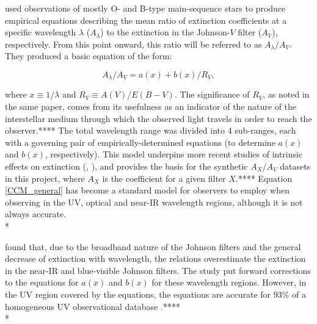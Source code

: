 \documentclass[12pt, a4paper]{report}
\begin{document}
\cite{1989ApJ...345..245C} used observations of mostly O- and B-type main-sequence stars to produce empirical equations describing the mean ratio of extinction coefficients at a specific wavelength $\lambda$ ($A_{\lambda}$) to the extinction in the Johnson-$V$ filter ($A_{V}$), respectively. From this point onward, this ratio will be referred to as $A_{\lambda}/A_{V}$. They produced a basic equation of the form:


\begin{equation}
A_{\lambda}/A_{V} = a(x) + b(x)/R_{V},
\label{CCM_general}
\end{equation}

where $x \equiv 1/\lambda$ and $R_{V} \equiv A(V)/E(B-V)$. The significance of $R_{V}$, as noted in the same paper, comes from its usefulness as an indicator of the nature of the interstellar medium through which the observed light travels in order to reach the observer.**** The total wavelength range was divided into 4 sub-ranges, each with a governing pair of empirically-determined equations (to determine $a(x)$ and $b(x)$, respectively). This model underpins more recent studies of intrinsic effects on extinction (\cite{2008PASP..120..583G}, \cite{2018MNRAS.479L.102C}), and provides the basis for the synthetic $A_{X}/A_{V}$ datasets in this project, where $A_{X}$ is the coefficient for a given filter $X$.**** Equation \ref{CCM_general} has become a standard model for observers to employ when observing in the UV, optical and near-IR wavelength regions, although it is not always accurate. \\*

\cite{1999PASP..111...63F} found that, due to the broadband nature of the Johnson filters and the general decrease of extinction with wavelength, the \cite{1989ApJ...345..245C} relations overestimate the extinction in the near-IR and blue-visible Johnson filters. The study put forward corrections to the equations for $a(x)$ and $b(x)$ for these wavelength regions. However, in the UV region covered by  the \cite{1989ApJ...345..245C} equations, the equations are accurate for 93\% of a homogeneous UV observational database \citep{2004ApJ...616..912V}.**** \\*
\end{document}
